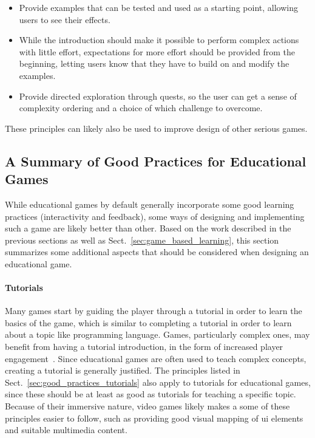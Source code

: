 \begin{itemize}
	\item Provide examples that can be tested and used as a starting point, allowing users to see their effects.
	\item While the introduction should make it possible to perform complex actions with little effort, expectations for more effort should be provided from the beginning, letting users know that they have to build on and modify the examples.
	\item Provide directed exploration through quests, so the user can get a sense of complexity ordering and a choice of which challenge to overcome.
\end{itemize}

\noindent
These principles can likely also be used to improve design of other serious games.

\subsection{A Summary of Good Practices for Educational Games}
\label{sec:good_practices_games}
While educational games by default generally incorporate some good learning practices (interactivity and feedback), some ways of designing and implementing such a game are likely better than other. Based on the work described in the previous sections as well as Sect.~\ref{sec:game_based_learning}, this section summarizes some additional aspects that should be considered when designing an educational game.

\paragraph{Tutorials} Many games start by guiding the player through a tutorial in order to learn the basics of the game, which is similar to completing a tutorial in order to learn about a topic like programming language. Games, particularly complex ones, may benefit from having a tutorial introduction, in the form of increased player engagement~\cite{andersen:tutorials_impact}. Since educational games are often used to teach complex concepts, creating a tutorial is generally justified. The principles listed in Sect.~\ref{sec:good_practices_tutorials} also apply to tutorials for educational games, since these should be at least as good as tutorials for teaching a specific topic. Because of their immersive nature, video games likely makes a some of these principles easier to follow, such as providing good visual mapping of \gls{ui} elements and suitable multimedia content.

